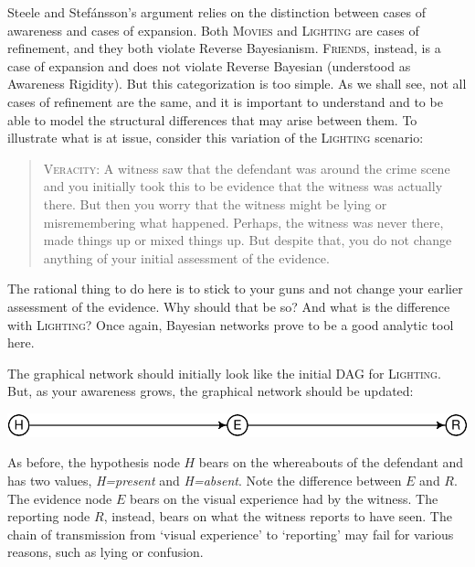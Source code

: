 \documentclass[
  11pt,
  dvipsnames,enabledeprecatedfontcommands]{scrartcl}
\begin{document}
Steele and Stefánsson's argument relies on the distinction between cases
of awareness and cases of expansion. Both \textsc{Movies} and
\textsc{Lighting} are cases of refinement, and they both violate Reverse
Bayesianism. \textsc{Friends}, instead, is a case of expansion and does
not violate Reverse Bayesian (understood as Awareness Rigidity). But
this categorization is too simple. As we shall see, not all cases of
refinement are the same, and it is important to understand and to be
able to model the structural differences that may arise between them. To
illustrate what is at issue, consider this variation of the
\textsc{Lighting} scenario:

\begin{quote}
\textsc{Veracity}: A witness saw that the defendant was around the crime
scene and you initially took this to be evidence that the witness was
actually there. But then you worry that the witness might be lying or
misremembering what happened. Perhaps, the witness was never there, made
things up or mixed things up. But despite that, you do not change
anything of your initial assessment of the evidence.
\end{quote}

\noindent   The rational thing to do here is to stick to your guns and
not change your earlier assessment of the evidence. Why should that be
so? And what is the difference with \textsc{Lighting}? Once again,
Bayesian networks prove to be a good analytic tool here.

The graphical network should initially look like the initial DAG for
\textsc{Lighting}. But, as your awareness grows, the graphical network
should be updated:

\begin{center}\includegraphics[width=0.5\linewidth,height=0.3\textheight]{ReplyToSteeleStefansson2_files/figure-latex/veracityDAG-1} \end{center}

\noindent As before, the hypothesis node \(H\) bears on the whereabouts
of the defendant and has two values, \textit{H=present} and
\textit{H=absent}. Note the difference between \(E\) and \(R\). The
evidence node \(E\) bears on the visual experience had by the witness.
The reporting node \(R\), instead, bears on what the witness reports to
have seen. The chain of transmission from `visual experience' to
`reporting' may fail for various reasons, such as lying or confusion.
\end{document}
